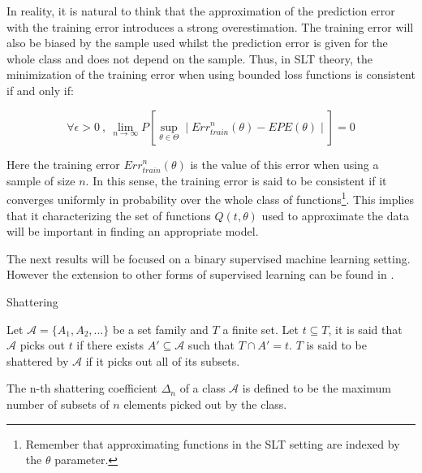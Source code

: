 In reality, it is natural to think that the approximation of the prediction error with the training error introduces a strong overestimation. The training error will also be biased by the sample used whilst the prediction error is given for the whole class and does not depend on the sample. Thus, in SLT theory, the minimization of the training error when using bounded loss functions is consistent if and only if:


$$\forall \epsilon > 0 \ , \ \lim_{n\to\infty} P\left[ \sup_{\theta \in \Theta} \mid Err^{n}_{train}(\theta)  - EPE(\theta) \mid \right]  = 0 $$  %


Here the training error $Err^{n}_{train}(\theta)$ is the value of this error when using a sample of size $n$. In this sense, the training error is said to be consistent if it converges uniformly in probability over the whole class of functions\footnote{Remember that approximating functions in the SLT setting are indexed by the $\theta$ parameter.}. This implies that it characterizing the set of functions $Q(t,\theta)$ used to approximate the data will be important in finding an appropriate model. %

The next results will be focused on a binary supervised machine learning setting. However the extension to other forms of supervised learning can be found in \textcite{cherkassky-learning2007}.

\begin{definition}{Shattering}

Let $\mathcal {A}= \{A_1,A_{2},\dots \}$ be a set family and $T$ a finite set. Let $t \subseteq T$, it is said that $\mathcal {A}$ picks out $t$ if there exists $A' \subseteq \mathcal {A} $ such that $ T \cap A' = t$. $T$ is said to be shattered by $\mathcal {A}$ if it picks out all of its subsets.


\end{definition}

The n-th shattering coefficient $\Delta_n$ of a class $\mathcal {A}$ is defined to be the maximum number of subsets of $n$ elements picked out by the class.

